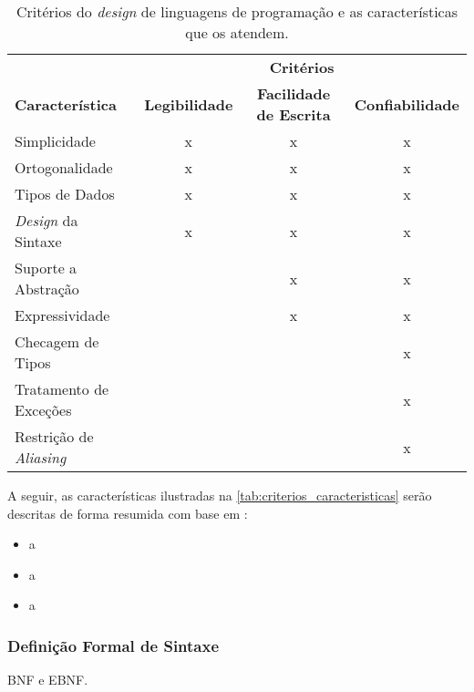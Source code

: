 \begin{table}[h]
	\centering
	\caption{Critérios do \textit{design} de linguagens de programação e as características que os atendem.}
	{
		\begin{tabular}{lccc}
		\hline
		& \multicolumn{3}{c}{\textbf{Critérios}} \\
		\cline{2-4}
		\textbf{Característica} & \textbf{Legibilidade} & \textbf{Facilidade de Escrita} & \textbf{Confiabilidade} \\
		Simplicidade & x & x & x \\
		Ortogonalidade & x & x & x \\
		Tipos de Dados & x & x & x \\
		\textit{Design} da Sintaxe & x & x & x \\
		Suporte a Abstração & & x & x \\
		Expressividade & & x & x \\
		Checagem de Tipos & & & x \\
		Tratamento de Exceções & & & x \\
		Restrição de \textit{Aliasing} & & & x \\
		\hline
		\end{tabular}
	}
	\label{tab:criterios_caracteristicas}
\end{table}

A seguir, as características ilustradas na \autoref{tab:criterios_caracteristicas} serão descritas de forma resumida com base em :


\begin{itemize}
	\item a
\end{itemize}


\begin{itemize}
	\item a
\end{itemize}


\begin{itemize}
	\item a
\end{itemize}

\subsubsection{Definição Formal de Sintaxe}

BNF e EBNF.
